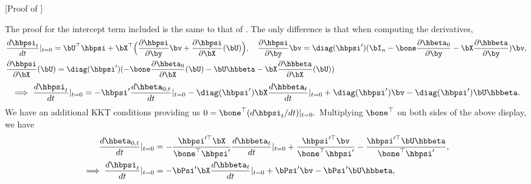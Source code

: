 \documentclass{colt2022} %
\renewenvironment{proof}[1][]
{
    \begin{newproof}
    \ifthenelse{\equal{#1}{}}{ }{\textbf{(#1) }}%
}{
    \end{newproof}
}
\numberwithin{equation}{section}
\begin{document}
\begin{proof} [Proof of ] 

    The proof for the intercept term included is the same to that of 
    .
    The only difference is that when computing the derivatives, 
    \begin{align*}
        &\frac{ d \hbpsi_{t} }{ d t }|_{t=0}
        =
        \bU^{\top} \hbpsi
        +
        \bX^{\top}
        \Bigl(
            \frac{ \partial \hbpsi }{ \partial \by }
            \bv
            +
            \frac{ \partial \hbpsi }{ \partial \bX } (\bU)
        \Bigr), \quad
        \frac{ \partial \hbpsi }{ \partial \by }
        \bv
        =
        \diag(\hbpsi') (\bI_{n} - \bone 
        \frac{ \partial \hbeta_{0} }{ \partial \by }
        - \bX \frac{ \partial \hbbeta }{ \partial \by }
        )
        \bv
        ,
    \\
        &\frac{
            \partial \hbpsi 
        }{
            \partial \bX
        } (\bU)
        =
        \diag(\hbpsi')
        ( - \bone 
        \frac{
            \partial \hbeta_{0}
        }{
            \partial \bX
        } (\bU)
        - \bU \hbbeta 
        - \bX \frac{ \partial \hbbeta }{ \partial \bX } (\bU)
        )
    \end{align*}
    \begin{align*}
        \implies 
        \frac{ d \hbpsi_{t} }{ d t }|_{t = 0}
        =
        - \hbpsi' 
        \frac{ d \hbeta_{0,t} }{ d t  }|_{t = 0}
        - \diag(\hbpsi') \bX 
        \frac{ d \hbbeta_{t} }{ d t  }|_{t=0}
        + \diag(\hbpsi') \bv 
        - \diag(\hbpsi') \bU \hbbeta.
    \end{align*}
    We have an additional KKT conditions providing us
    $ 
        0
        =
        \bone^{\top} 
        (d \hbpsi_{t} / d t) |_{t=0}
        .
    $
    Multiplying $\bone^{\top}$
    on both sides of the above display, 
    we have 
    \begin{align*}
        \frac{ d \hbeta_{0,t} }{ d t }|_{t=0}
        &=
        - \frac{ \hbpsi'^{\top} \bX }{ \bone ^{\top} \hbpsi' } \frac{ d \hbbeta_{t} }{ d t }|_{t=0}
        + \frac{ \hbpsi'^{\top} \bv }{ \bone^{\top} \hbpsi' } 
        - \frac{ \hbpsi'^{\top} \bU \hbbeta }{ \bone^{\top} \hbpsi' }
        ,
    \\
        \implies 
        \frac{ d \hbpsi_{t} }{ d t }|_{t = 0}
        &=  
        - \bPsi' \bX \frac{ d \hbbeta_{t} }{ d t }|_{t = 0}
        + \bPsi' \bv
        - \bPsi' \bU \hbbeta 
        ,
    \end{align*}

\end{proof}
\end{document}
